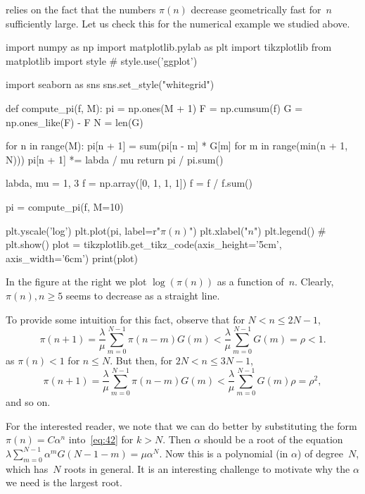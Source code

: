 \documentclass[queueing-book.tex]{subfiles}
\begin{document}
 relies on the fact that the numbers $\pi(n)$ decrease geometrically fast for~$n$ sufficiently large.
Let us check this for the numerical example we studied above.
\begin{marginfigure}
\begin{pycode}[ignore]
import numpy as np
import matplotlib.pylab as plt
import tikzplotlib
from matplotlib import style
# style.use('ggplot')

import seaborn as sns
sns.set_style("whitegrid")


def compute_pi(f, M):
    pi = np.ones(M + 1)
    F = np.cumsum(f)
    G = np.ones_like(F) - F
    N = len(G)

    for n in range(M):
        pi[n + 1] = sum(pi[n - m] * G[m] for m in range(min(n + 1, N)))
        pi[n + 1] *= labda / mu
    return pi / pi.sum()

labda, mu = 1, 3
f = np.array([0, 1, 1, 1])
f = f / f.sum()

pi = compute_pi(f, M=10)


plt.yscale('log')
plt.plot(pi, label=r"$\pi(n)$")
plt.xlabel("$n$")
plt.legend()
# plt.show()
plot = tikzplotlib.get_tikz_code(axis_height='5cm', axis_width='6cm')
print(plot)
\end{pycode}
\end{marginfigure}
In the figure at the right we plot $\log (\pi(n))$  as a function of~$n$. Clearly, $\pi(n), n\geq 5$ seems to decrease as a straight line.


To provide some intuition for this fact, observe that  for $N<n\leq 2N-1$,
\begin{equation*}
  \pi(n+1) = \frac{\lambda}{\mu} \sum_{m=0}^{N-1}\pi(n-m)G(m) < \frac{\lambda}{\mu} \sum_{m=0}^{N-1} G(m)  = \rho < 1.
\end{equation*}
as $\pi(n) < 1$ for $n\leq N$. But then, for $2N< n \leq 3N-1$,
\begin{equation*}
  \pi(n+1) = \frac{\lambda}{\mu} \sum_{m=0}^{N-1}\pi(n-m)G(m) < \frac{\lambda}{\mu} \sum_{m=0}^{N-1} G(m)\rho  = \rho^2,
\end{equation*}
and so on.

For the interested reader, we note that we can do better by substituting the form $\pi(n)= C \alpha^n$ into~\cref{eq:42} for $k>N$.
Then $\alpha$ should be a root of the equation $\lambda \sum_{m=0}^{N-1} \alpha^m G(N-1-m) = \mu \alpha^{N}$.
Now this is a polynomial (in $\alpha$) of degree~$N$, which has~$N$ roots in general.
It is an interesting challenge to motivate why the $\alpha$ we need is the largest root.
\end{document}
